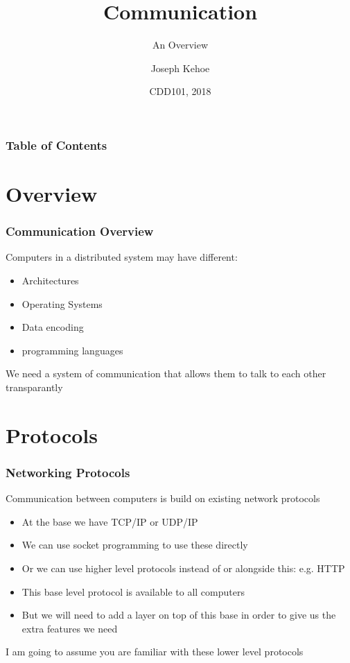 \documentclass{beamer}
\title[Distributed Systems] %
{Communication}
\subtitle{An Overview}
\author[Dr. Joseph Kehoe] %
{Joseph Kehoe\inst{1}}
\institute[IT Carlow] %
{
	\inst{1}%
	Department of Computing and Networking\\
	Institute of Technology Carlow
}
\date[ITC 2018] %
{CDD101, 2018}
\begin{document}
 
\frame{\titlepage}
 
  \begin{frame}
  	\frametitle{Table of Contents}
  	\tableofcontents
  \end{frame}
 

\section{Overview}
  \begin{frame}
  	\frametitle{Communication Overview}
  	Computers in a distributed system may have different:
  	\begin{itemize}
  		\item Architectures
  		\item Operating Systems
  		\item Data encoding
  		\item programming languages
  	\end{itemize}
We need a system of communication that allows them to talk to each other transparantly
  	
  \end{frame}
  
\section{Protocols}

  \begin{frame}
  	\frametitle{Networking Protocols}
  	Communication between computers is build on existing network protocols
  	\begin{itemize}
  		\item At the base we have TCP/IP or UDP/IP
  		\item We can use socket programming to use these directly
  		\item Or we can use higher level protocols instead of or alongside this: e.g. HTTP
  		\item This base level protocol is available to all computers
  		\item But we will need to add a layer on top of this base in order to give us the extra features we need
  	\end{itemize}
I am going to assume you are familiar with these lower level protocols
  	
  \end{frame}
\end{document}
